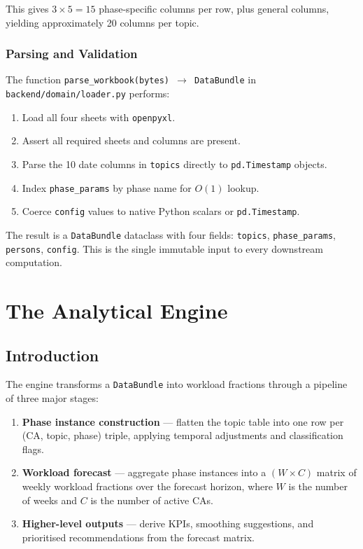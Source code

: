 \documentclass[12pt,a4paper]{report}
\begin{document}
This gives $3 \times 5 = 15$ phase-specific columns per row, plus
general columns, yielding approximately 20 columns per topic.

\subsection{Parsing and Validation}

The function \texttt{parse\_workbook(bytes) $\to$ DataBundle} in
\texttt{backend/domain/loader.py} performs:

\begin{enumerate}
  \item Load all four sheets with \texttt{openpyxl}.
  \item Assert all required sheets and columns are present.
  \item Parse the 10 date columns in \texttt{topics} directly to
        \texttt{pd.Timestamp} objects.
  \item Index \texttt{phase\_params} by phase name for $O(1)$ lookup.
  \item Coerce \texttt{config} values to native Python scalars or
        \texttt{pd.Timestamp}.
\end{enumerate}

The result is a \texttt{DataBundle} dataclass with four fields:
\texttt{topics}, \texttt{phase\_params}, \texttt{persons}, \texttt{config}.
This is the single immutable input to every downstream computation.

\chapter{The Analytical Engine}

\section{Introduction}

The engine transforms a \texttt{DataBundle} into workload fractions
through a pipeline of three major stages:

\begin{enumerate}
  \item \textbf{Phase instance construction} --- flatten the topic table
        into one row per (CA, topic, phase) triple, applying temporal
        adjustments and classification flags.
  \item \textbf{Workload forecast} --- aggregate phase instances into
        a $(W \times C)$ matrix of weekly workload fractions over the
        forecast horizon, where $W$ is the number of weeks and $C$ is
        the number of active CAs.
  \item \textbf{Higher-level outputs} --- derive KPIs, smoothing
        suggestions, and prioritised recommendations from the forecast
        matrix.
\end{enumerate}
\end{document}
